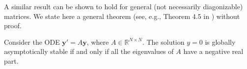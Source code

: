 A similar result can be shown to hold for general (not necessarily diagonizable) matrices. We state here a general theorem (see, e.g., Theorem 4.5 in \cite{khalil2002nonlinear}) without proof.

\begin{theorem}
Consider the ODE $\mathbf{y}' = A \mathbf{y}$, where $A\in \mathbb{R}^{N \times N}$. The solution $y = 0$ is globally asymptotically stable if and only if all the eigenvalues of $A$ have a negative real part.
\end{theorem}
